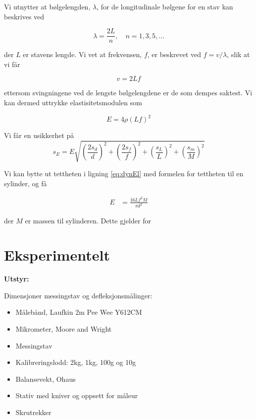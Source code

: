\documentclass[a4paper,11pt, twocolumn]{article}
\begin{document}
Vi utnytter at bølgelengden, $\lambda$, for de longitudinale bølgene for en stav kan beskrives ved 

\begin{equation}
	\lambda = \frac{2L}{n}, \quad n = 1, 3, 5, \dots
\end{equation}

der $L$ er stavens lengde. Vi vet at frekvensen, $f$, er beskrevet ved $f = v/\lambda$, slik at vi får 

\begin{equation}
	v = 2Lf
\end{equation}

ettersom svingningene ved de lengste bølgelengdene er de som dempes saktest. Vi kan dermed uttrykke elastisitetsmodulen som

\begin{equation}
	E = 4\rho(Lf)^2
	\label{eq:dynEl}
\end{equation}

Vi får en usikkerhet på
\begin{equation}
	s_E = E\sqrt{\left(\frac{2s_d}{d}\right)^2+\left(\frac{2s_f}{f}\right)^2+\left(\frac{s_L}{L}\right)^2+\left(\frac{s_m}{M}\right)^2}	
	\label{eq:feilDynamisk}
\end{equation}

Vi kan bytte ut tettheten i ligning \eqref{eq:dynEl} med formelen for tettheten til en sylinder, og få

\begin{align}
	E &= \frac{16Lf^2M}{\pi d^2}
\end{align}

der $M$ er massen til sylinderen. Dette gjelder for  

\section{Eksperimentelt}
{\bf Utstyr:}

Dimensjoner messingstav og defleksjonsmålinger:
\begin{itemize}
	\item Målebånd, Laufkin 2m Pee Wee Y612CM
	\item Mikrometer, Moore and Wright
	\item Messingstav
	\item Kalibreringslodd: 2kg, 1kg, 100g og 10g
	\item Balansevekt, Ohaus
	\item Stativ med kniver og oppsett for måleur
	\item Skrutrekker
\end{itemize}
\end{document}

